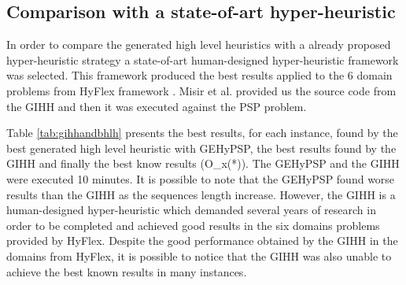 \documentclass[conference]{IEEEtran}
\begin{document}
\begin{table}[]
	\centering
	\caption{Results from the best individual found in GEHyPSP-3}
	\label{bestGExp3}
\end{table}




\subsection{Comparison with a state-of-art hyper-heuristic}
In order to compare the generated high level heuristics with a already proposed hyper-heuristic strategy a state-of-art human-designed hyper-heuristic framework \cite{misir2012intelligent} was selected. This framework produced the best results applied to the 6 domain problems from HyFlex framework \cite{ochoa2012hyflex}. Misir et al. \cite{misir2012intelligent} provided us the source code from the GIHH and then it was executed against the PSP problem. 

Table \ref{tab:gihhandbhlh} presents the best results, for each instance, found by the best generated high level heuristic with GEHyPSP, the best results found by the GIHH \cite{misir2012intelligent} and finally the best know results (O_x(*)). The GEHyPSP and the GIHH were executed 10 minutes. It is possible to note that the GEHyPSP found worse results than the GIHH as the sequences length increase. However, the GIHH is a human-designed hyper-heuristic which demanded several years of research in order to be completed and achieved good results in the six domains problems provided by HyFlex. Despite the good performance obtained by the GIHH in the domains from HyFlex, it is possible to notice that the GIHH was also unable to achieve the best known results in many instances.
\end{document}

